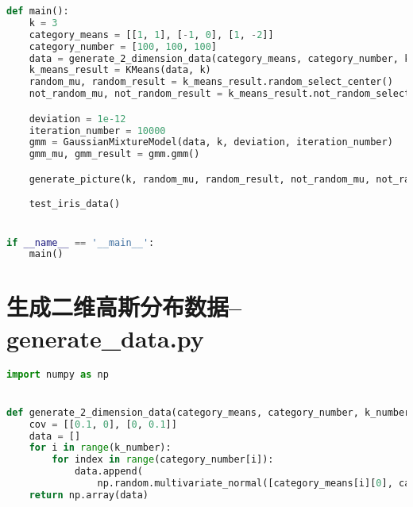 \documentclass{hitreport}
\begin{document}
\begin{appendices}
\begin{lstlisting}[language=python]
def main():
    k = 3
    category_means = [[1, 1], [-1, 0], [1, -2]]
    category_number = [100, 100, 100]
    data = generate_2_dimension_data(category_means, category_number, k)
    k_means_result = KMeans(data, k)
    random_mu, random_result = k_means_result.random_select_center()
    not_random_mu, not_random_result = k_means_result.not_random_select_center()

    deviation = 1e-12
    iteration_number = 10000
    gmm = GaussianMixtureModel(data, k, deviation, iteration_number)
    gmm_mu, gmm_result = gmm.gmm()

    generate_picture(k, random_mu, random_result, not_random_mu, not_random_result, gmm_mu, gmm_result)

    test_iris_data()


if __name__ == '__main__':
    main()

\end{lstlisting}

\section{生成二维高斯分布数据--generate\_data.py}\label{app:gendata}
\begin{lstlisting}[language=python]
import numpy as np


def generate_2_dimension_data(category_means, category_number, k_number):
    cov = [[0.1, 0], [0, 0.1]]
    data = []
    for i in range(k_number):
        for index in range(category_number[i]):
            data.append(
                np.random.multivariate_normal([category_means[i][0], category_means[i][1]], cov).tolist())
    return np.array(data)

\end{lstlisting}

\end{appendices}
\end{document}
